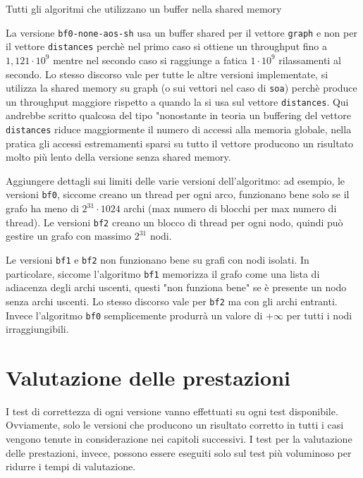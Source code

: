 \documentclass[a4paper]{article}
\begin{document}
	Tutti gli algoritmi che utilizzano un buffer nella shared memory
	
	La versione \texttt{bf0-none-aos-sh} usa un buffer shared per il vettore \texttt{graph} e non per il vettore \texttt{distances} perchè nel primo caso si ottiene un throughput fino a $1,121\cdot 10^9$ mentre nel secondo caso si raggiunge a fatica $1\cdot 10^9$ rilassamenti al secondo. Lo stesso discorso vale per tutte le altre versioni implementate, si utilizza la shared memory su graph (o sui vettori nel caso di \texttt{soa}) perchè produce un throughput maggiore rispetto a quando la si usa sul vettore \texttt{distances}. Qui andrebbe scritto qualcosa del tipo "nonostante in teoria un buffering del vettore \texttt{distances} riduce maggiormente il numero di accessi alla memoria globale, nella pratica gli accessi estremamenti sparsi su tutto il vettore producono un risultato molto più lento della versione senza shared memory.
	
	Aggiungere dettagli sui limiti delle varie versioni dell'algoritmo: ad esempio, le versioni \texttt{bf0}, siccome creano un thread per ogni arco, funzionano bene solo se il grafo ha meno di $2^{31}\cdot 1024$ archi (max numero di blocchi per max numero di thread). Le versioni \texttt{bf2} creano un blocco di thread per ogni nodo, quindi può gestire un grafo con massimo $2^{31}$ nodi.
	
	Le versioni \texttt{bf1} e \texttt{bf2} non funzionano bene su grafi con nodi isolati. In particolare, siccome l'algoritmo \texttt{bf1} memorizza il grafo come una lista di adiacenza degli archi uscenti, questi "non funziona bene" se è presente un nodo senza archi uscenti. Lo stesso discorso vale per \texttt{bf2} ma con gli archi entranti. Invece l'algoritmo \texttt{bf0} semplicemente produrrà un valore di $+\infty$ per tutti i nodi irraggiungibili.
	
	\section{Valutazione delle prestazioni}
	\label{section:perf}
	I test di correttezza di ogni versione vanno effettuati su ogni test disponibile. Ovviamente, solo le versioni che producono un risultato corretto in tutti i casi vengono tenute in considerazione nei capitoli successivi. I test per la valutazione delle prestazioni, invece, possono essere eseguiti solo sul test più voluminoso per ridurre i tempi di valutazione.
	
\end{document}
